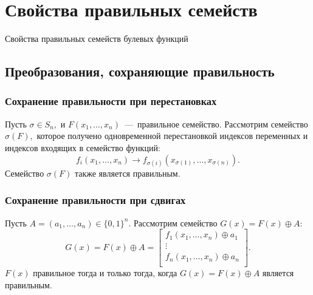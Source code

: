 \section{Свойства правильных семейств}
\begin{frame}
    \begin{center}
        \Huge
        Свойства правильных семейств булевых функций
    \end{center}
\end{frame}

\subsection{Преобразования, сохраняющие правильность}

\begin{frame}
    \frametitle{Сохранение правильности при перестановках}
    \begin{thm}
        Пусть $\sigma \in S_n,$ и $F(x_1, \ldots, x_n)$~---~правильное семейство.
        Рассмотрим семейство $\sigma(F),$ которое получено одновременной перестановкой индексов переменных и индексов входящих в семейство функций:
        \[
            f_i(x_1, \ldots, x_n) \to 
            f_{\sigma(i)}(x_{\sigma(1)}, \ldots, x_{\sigma(n)}).
        \]
        Семейство $\sigma(F)$ также является правильным.
    \end{thm}
\end{frame}


\begin{frame}
    \frametitle{Сохранение правильности при сдвигах}
    \begin{thm}
        Пусть $A = (a_1, \ldots, a_n) \in \{0, 1\}^n.$
        Рассмотрим семейство $G(x) = F(x) \oplus A:$
        \[
            G(x) = F(x) \oplus A = 
            \begin{bmatrix}
                f_1(x_1, \ldots, x_n) \oplus a_1 \\
                \vdots \\
                f_n(x_1, \ldots, x_n) \oplus a_n \\
            \end{bmatrix}.
        \]
        $F(x)$ правильное тогда и только тогда,
        когда $G(x) = F(x) \oplus A$ является правильным.
    \end{thm}
\end{frame}


